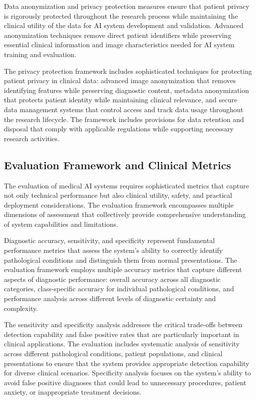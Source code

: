 Data anonymization and privacy protection measures ensure that patient privacy is rigorously protected throughout the research process while maintaining the clinical utility of the data for AI system development and validation. Advanced anonymization techniques remove direct patient identifiers while preserving essential clinical information and image characteristics needed for AI system training and evaluation.

The privacy protection framework includes sophisticated techniques for protecting patient privacy in clinical data: advanced image anonymization that removes identifying features while preserving diagnostic content, metadata anonymization that protects patient identity while maintaining clinical relevance, and secure data management systems that control access and track data usage throughout the research lifecycle. The framework includes provisions for data retention and disposal that comply with applicable regulations while supporting necessary research activities.

\subsection{Evaluation Framework and Clinical Metrics}

The evaluation of medical AI systems requires sophisticated metrics that capture not only technical performance but also clinical utility, safety, and practical deployment considerations. The evaluation framework encompasses multiple dimensions of assessment that collectively provide comprehensive understanding of system capabilities and limitations.

Diagnostic accuracy, sensitivity, and specificity represent fundamental performance metrics that assess the system's ability to correctly identify pathological conditions and distinguish them from normal presentations. The evaluation framework employs multiple accuracy metrics that capture different aspects of diagnostic performance: overall accuracy across all diagnostic categories, class-specific accuracy for individual pathological conditions, and performance analysis across different levels of diagnostic certainty and complexity.

The sensitivity and specificity analysis addresses the critical trade-offs between detection capability and false positive rates that are particularly important in clinical applications. The evaluation includes systematic analysis of sensitivity across different pathological conditions, patient populations, and clinical presentations to ensure that the system provides appropriate detection capability for diverse clinical scenarios. Specificity analysis focuses on the system's ability to avoid false positive diagnoses that could lead to unnecessary procedures, patient anxiety, or inappropriate treatment decisions.

